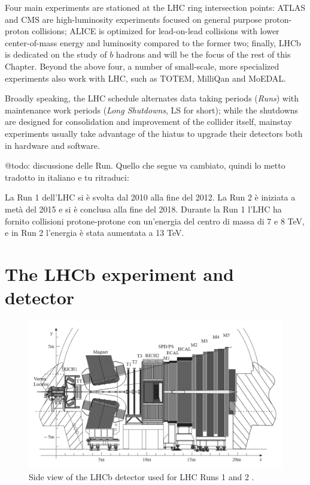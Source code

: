 Four main experiments are stationed at the LHC ring intersection points:
ATLAS and CMS are high-luminosity experiments focused on general purpose proton-proton collisions; ALICE is optimized for lead-on-lead collisions with lower center-of-mass energy and luminosity compared to the former two; finally, LHCb is dedicated on the study of $b$ hadrons and will be the focus of the rest of this Chapter.
Beyond the above four, a number of small-scale, more specialized experiments also work with LHC, such as TOTEM, MilliQan and MoEDAL.

Broadly speaking, the LHC schedule alternates data taking periods (\textit{Runs}) with maintenance work periods (\textit{Long Shutdowns}, LS for short);
while the shutdowns are designed for consolidation and improvement of the collider itself, mainstay experiments usually take advantage of the hiatus to upgrade their detectors both in hardware and software.

@todo: discussione delle Run. Quello che segue va cambiato, quindi lo metto tradotto in italiano e tu ritraduci:

La Run 1 dell'LHC si è svolta dal 2010 alla fine del 2012. La Run 2 è iniziata a metà del 2015 e si è conclusa alla fine del 2018. Durante la Run 1 l'LHC ha fornito collisioni protone-protone con un'energia del centro di massa di 7 e 8 TeV, e in Run 2 l'energia è stata aumentata a 13 TeV.


\section{The LHCb experiment and detector}
\label{sec:2:lhcb_detector}

\begin{figure}[t]
	\centering
	\includegraphics[width=\textwidth]{graphics/02-lhcb/lhcb_diagram.png}
	\caption[LHCb detector side view (Runs 1 and 2).]{Side view of the LHCb detector used for LHC Runs 1 and 2 \cite{Antunes-Nobrega:630827}.}
	\label{fig:2:lhcb_diagram}
\end{figure}

